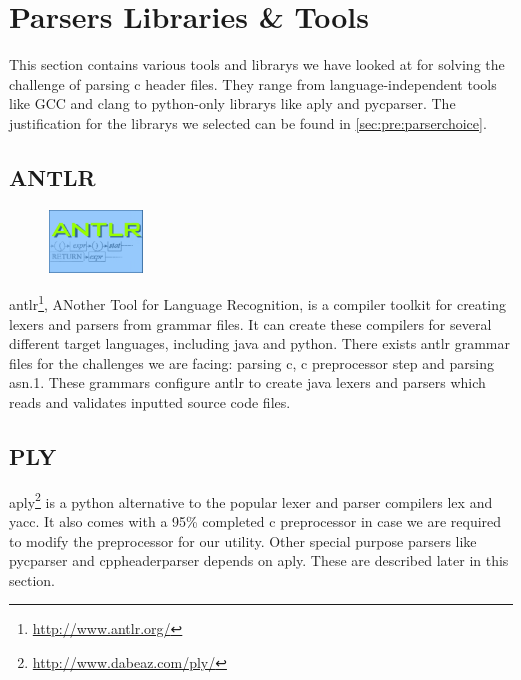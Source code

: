 \section{Parsers Libraries \& Tools}
\label{sec:pre:parser}
This section contains various tools and \glspl{library} we have looked at for solving
the challenge of parsing \Gls{c} \gls{header} files. They range from language-independent
tools like GCC and \Gls{clang} to \Gls{python}-only \glspl{library} like \Gls{aply} and \gls{pycparser}. The
justification for the \glspl{library} we selected can be found in
\autoref{sec:pre:parserchoice}.

\subsection{ANTLR}
\label{sec:pre:antlr}
\begin{figure}
	\vspace{-20pt}
	\includegraphics[width=2.5cm]{./planning/img/antlr_logo}
	\vspace{-20pt}
\end{figure}
\Gls{antlr}\footnote{\url{http://www.antlr.org/}}, ANother Tool for Language
Recognition, is a compiler toolkit for creating \glspl{lexer} and \glspl{parser} from grammar
files. It can create these compilers for several different target languages,
including \Gls{java} and \Gls{python}. There exists \Gls{antlr} grammar files for the challenges
we are facing: parsing \Gls{c}, \Gls{c} \gls{preprocessor} step and parsing \Gls{asn.1}. These grammars
configure \Gls{antlr} to create \Gls{java} \glspl{lexer} and \glspl{parser} which reads and validates
inputted source code files.

\subsection{PLY}
\Gls{aply}\footnote{\url{http://www.dabeaz.com/ply/}} is a \Gls{python} alternative to the
popular \gls{lexer} and \gls{parser} compilers lex and yacc. It also comes with a 95\%
completed \Gls{c} \gls{preprocessor} in case we are required to modify the \gls{preprocessor}
for our \gls{utility}. Other special purpose \glspl{parser} like \gls{pycparser} and
cppheaderparser depends on \Gls{aply}. These are described later in this section.

